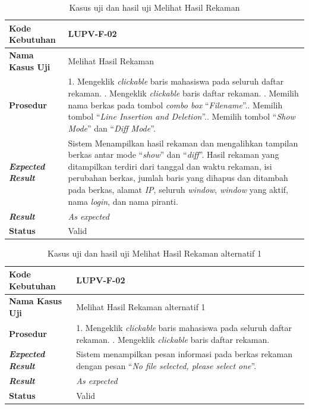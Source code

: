 \begin{longtable}{|L{3cm}|L{9cm}|}
  \caption{Kasus uji dan hasil uji Melihat Hasil Rekaman}\label{tab:show-records-main} \\
  \hline
  \textbf{Kode Kebutuhan} & LUPV-F-02 \\\hline
  \textbf{Nama Kasus Uji} & Melihat Hasil Rekaman \\\hline
  \textbf{Prosedur} & 1. Mengeklik \emph{clickable} baris mahasiswa pada seluruh daftar rekaman. . Mengeklik \emph{clickable} baris daftar rekaman. . Memilih nama berkas pada tombol \emph{combo box}
                      ``\emph{Filename}''.. Memilih tombol ``\emph{Line Insertion and Deletion}''.. Memilih tombol ``\emph{Show Mode}'' dan ``\emph{Diff Mode}''.\\\hline
  \textbf{\emph{Expected Result}} & Sistem Menampilkan hasil rekaman dan
                                    mengalihkan tampilan berkas antar mode ``\emph{show}'' dan
                                    ``\emph{diff}''. Hasil rekaman yang
                                    ditampilkan terdiri dari
                                    tanggal dan waktu rekaman, isi perubahan
                                    berkas, jumlah baris yang dihapus dan ditambah
                                    pada berkas, alamat \emph{IP}, seluruh
                                    \emph{window}, \emph{window} yang aktif,
                                    nama \emph{login}, dan nama piranti.\\\hline
  \textbf{\emph{Result}} & \emph{As expected} \\\hline
  \textbf{Status} & Valid\\\hline
\end{longtable}

\begin{longtable}{|L{3cm}|L{9cm}|}
  \caption{Kasus uji dan hasil uji Melihat Hasil Rekaman alternatif 1}\label{tab:show-records-1} \\
  \hline
  \textbf{Kode Kebutuhan} & LUPV-F-02 \\\hline
  \textbf{Nama Kasus Uji} & Melihat Hasil Rekaman alternatif 1 \\\hline
  \textbf{Prosedur} & 1. Mengeklik \emph{clickable} baris mahasiswa pada seluruh daftar rekaman. . Mengeklik \emph{clickable} baris daftar rekaman.\\\hline
  \textbf{\emph{Expected Result}} & Sistem menampilkan pesan informasi pada berkas rekaman dengan
                                    pesan ``\emph{No file selected, please select one}''.\\\hline
  \textbf{\emph{Result}} & \emph{As expected} \\\hline
  \textbf{Status} & Valid\\\hline
\end{longtable}

